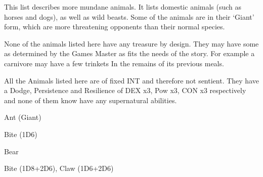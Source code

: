 This list describes more mundane animals. It lists domestic animals (such as horses and dogs), as well as wild beasts. Some of the animals are in their ‘Giant’ form, which are more threatening opponents than their normal species.

None of the animals listed here have any treasure by design. They may have some as determined by the Games Master as fits the needs of the story. For example a carnivore may have a few trinkets In the remains of its previous meals.

All the Animals listed here are of fixed INT and therefore not sentient. They have a Dodge, Persistence and Resilience of DEX x3, Pow x3, CON x3 respectively and none of them know have any supernatural abilities.

\vspace{1em}

\begin{samepage}
\begin{monsterbox}{Ant (Giant)}
	\basics[%
        hitpoints  = 12, 
	majorwound = 6,
	damagemodifier = 0,
	powerpoints = 6,
	movementrate = 15m,
	armor = Chitin (5 AP),
	]
	\rpghline%
	\stats[ %
		STR = 4D6   (14),
		CON = 3D6+6 (17),
		DEX = 2D6+6 (13),
		SIZ = 2D6   (7),
		INT = 2     (2),
		POW = 1D6+3 (6),
		CHA = 5     (5)
	]
	\rpghline%
	\begin{rpg-monsteraction}
		Bite (1D6)
	\end{rpg-monsteraction}
\end{monsterbox}
\end{samepage}


\begin{samepage}
\begin{monsterbox}{Bear}
	\basics[%
        hitpoints  = 19, 
	majorwound = 10,
	damagemodifier = 0,
	powerpoints = 11,
	movementrate = 23m,
	armor = Tough hide (3 AP),
	]
	\rpghline%
	\stats[ %
		STR = 3D6+15 (25),
		CON = 2D6+6  (13),
		DEX = 3D6    (11),
		SIZ = 3D6+15 (25),
		INT = 5     (5),
		POW = 3D6   (11),
		CHA = 5     (5)
	]
	\rpghline%
	\begin{rpg-monsteraction}
		Bite (1D8+2D6), Claw (1D6+2D6)
	\end{rpg-monsteraction}
\end{monsterbox}
\end{samepage}


